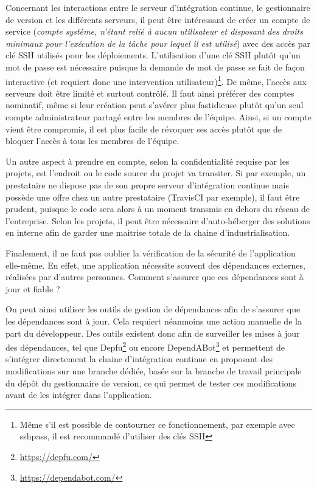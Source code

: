 Concernant les interactions entre le serveur d'intégration continue, le gestionnaire de version et les différents serveurs, il peut être intéressant de créer un compte de service (\emph{compte système, n'étant relié à aucun utilisateur et disposant des droits minimaux pour l'exécution de la tâche pour lequel il est utilisé}) avec des accès par clé \gls{SSH} utilisés pour les déploiements. L'utilisation d'une clé \gls{SSH} plutôt qu'un mot de passe est nécessaire puisque la demande de mot de passe se fait de façon interactive (et requiert donc une intervention utilisateur)\footnote{Même s'il est possible de contourner ce fonctionnement, par exemple avec sshpass, il est recommandé d'utiliser des clés \gls{SSH}}. De même, l'accès aux serveurs doit être limité et surtout contrôlé. Il faut ainsi préférer des comptes nominatif, même si leur création peut s'avérer plus fastidieuse plutôt qu'un seul compte administrateur partagé entre les membres de l'équipe. Ainsi, si un compte vient être compromis, il est plus facile de révoquer ses accès plutôt que de bloquer l'accès à tous les membres de l'équipe.

Un autre aspect à prendre en compte, selon la confidentialité requise par les projets, est l'endroit ou le code source du projet va transiter. Si par exemple, un prestataire ne dispose pas de son propre serveur d'intégration continue mais possède une offre chez un autre prestataire (TravisCI par exemple), il faut être prudent, puisque le code sera alors à un moment transmis en dehors du réseau de l'entreprise. Selon les projets, il peut être nécessaire d'auto-héberger des solutions en interne afin de garder une maitrise totale de la chaine d'industrialisation.

Finalement, il ne faut pas oublier la vérification de la sécurité de l'application elle-même. En effet, une application nécessite souvent des dépendances externes, réalisées par d'autres personnes. Comment s'assurer que ces dépendances sont à jour et fiable ? 

On peut ainsi utiliser les outils de gestion de dépendances afin de s'assurer que les dépendances sont à jour. Cela requiert néanmoins une action manuelle de la part du développeur. Des outils existent donc afin de surveiller les mises à jour des dépendances, tel que Depfu\footnote{\url{https://depfu.com/}} ou encore DependABot\footnote{\url{https://dependabot.com/}} et permettent de s'intégrer directement la chaine d'intégration continue en proposant des modifications sur une branche dédiée, basée sur la branche de travail principale du dépôt du gestionnaire de version, ce qui permet de tester ces modifications avant de les intégrer dans l'application.

